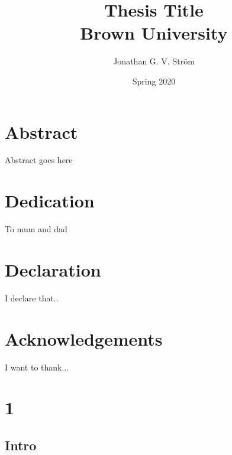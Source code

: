 \documentclass[12pt,twoside]{report}
\begin{document}
\title{
{Thesis Title}\\
{\large Brown University}\\
}
\author{Jonathan G. V. Ström}
\date{Spring 2020}
\maketitle

\chapter*{Abstract}
Abstract goes here

\chapter*{Dedication}
To mum and dad

\chapter*{Declaration}
I declare that..

\chapter*{Acknowledgements}
I want to thank...



\tableofcontents{}

%

\chapter{1}

\section{Intro}
\blinddocument
\appendix
\end{document}
